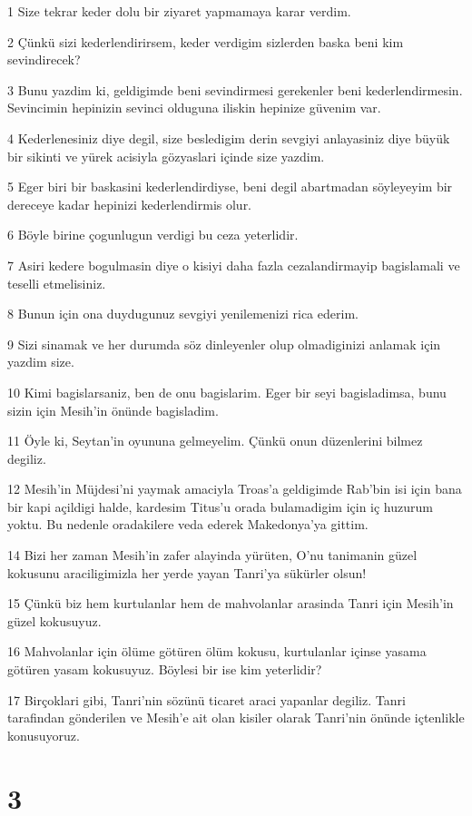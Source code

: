 \par 1 Size tekrar keder dolu bir ziyaret yapmamaya karar verdim.
\par 2 Çünkü sizi kederlendirirsem, keder verdigim sizlerden baska beni kim sevindirecek?
\par 3 Bunu yazdim ki, geldigimde beni sevindirmesi gerekenler beni kederlendirmesin. Sevincimin hepinizin sevinci olduguna iliskin hepinize güvenim var.
\par 4 Kederlenesiniz diye degil, size besledigim derin sevgiyi anlayasiniz diye büyük bir sikinti ve yürek acisiyla gözyaslari içinde size yazdim.
\par 5 Eger biri bir baskasini kederlendirdiyse, beni degil abartmadan söyleyeyim bir dereceye kadar hepinizi kederlendirmis olur.
\par 6 Böyle birine çogunlugun verdigi bu ceza yeterlidir.
\par 7 Asiri kedere bogulmasin diye o kisiyi daha fazla cezalandirmayip bagislamali ve teselli etmelisiniz.
\par 8 Bunun için ona duydugunuz sevgiyi yenilemenizi rica ederim.
\par 9 Sizi sinamak ve her durumda söz dinleyenler olup olmadiginizi anlamak için yazdim size.
\par 10 Kimi bagislarsaniz, ben de onu bagislarim. Eger bir seyi bagisladimsa, bunu sizin için Mesih'in önünde bagisladim.
\par 11 Öyle ki, Seytan'in oyununa gelmeyelim. Çünkü onun düzenlerini bilmez degiliz.
\par 12 Mesih'in Müjdesi'ni yaymak amaciyla Troas'a geldigimde Rab'bin isi için bana bir kapi açildigi halde, kardesim Titus'u orada bulamadigim için iç huzurum yoktu. Bu nedenle oradakilere veda ederek Makedonya'ya gittim.
\par 14 Bizi her zaman Mesih'in zafer alayinda yürüten, O'nu tanimanin güzel kokusunu araciligimizla her yerde yayan Tanri'ya sükürler olsun!
\par 15 Çünkü biz hem kurtulanlar hem de mahvolanlar arasinda Tanri için Mesih'in güzel kokusuyuz.
\par 16 Mahvolanlar için ölüme götüren ölüm kokusu, kurtulanlar içinse yasama götüren yasam kokusuyuz. Böylesi bir ise kim yeterlidir?
\par 17 Birçoklari gibi, Tanri'nin sözünü ticaret araci yapanlar degiliz. Tanri tarafindan gönderilen ve Mesih'e ait olan kisiler olarak Tanri'nin önünde içtenlikle konusuyoruz.

\chapter{3}

